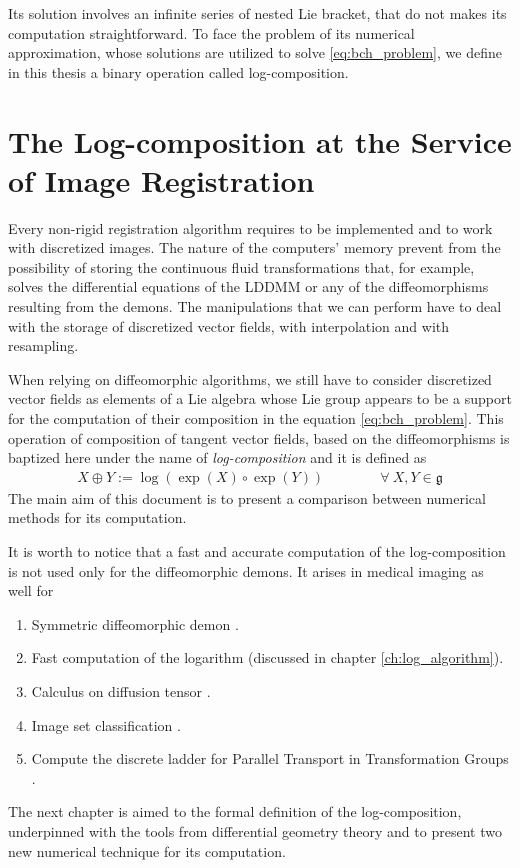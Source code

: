 Its solution involves an infinite series of nested Lie bracket, that do not makes its computation straightforward. 
To face the problem of its numerical approximation, whose solutions are utilized to solve \ref{eq:bch_problem}, we define in this thesis a binary operation called log-composition.


\section{The Log-composition at the Service of Image Registration}

Every non-rigid registration algorithm requires to be implemented and to work with discretized images.
The nature of the computers' memory prevent from the possibility of storing the continuous fluid transformations that, for example, solves the differential equations of the LDDMM or any of the diffeomorphisms resulting from the demons. The manipulations that we can perform have to deal with the storage of discretized vector fields, with interpolation and with resampling.

When relying on diffeomorphic algorithms, we still have to consider discretized vector fields as elements of a Lie algebra whose Lie group appears to be a support for the computation of their composition in the equation \ref{eq:bch_problem}.
This operation of composition of tangent vector fields, based on the diffeomorphisms is baptized here under the name of \emph{log-composition} and it is defined as
\begin{align*}
X \oplus Y := \log(\exp(X)\circ\exp( Y))
\qquad \qquad
\forall ~X, Y \in \mathfrak{g}
\end{align*}
The main aim of this document is to present a comparison between numerical methods for its computation. 

It is worth to notice that a fast and accurate computation of the log-composition is not used only for the diffeomorphic demons. It arises in medical imaging as well for
\begin{enumerate}
	\item Symmetric diffeomorphic demon \cite{vercauteren08}.
	\item Fast computation of the logarithm \cite{Bossa:08} (discussed in chapter \ref{ch:log_algorithm}).
	\item Calculus on diffusion tensor \cite{Arsigny:MRM:06}. 
	\item Image set classification \cite{huanglog}.
	\item Compute the discrete ladder for Parallel Transport in Transformation Groups \cite{Lorenzi:discrete_ladders:14}.
\end{enumerate}	
	
The next chapter is aimed to the formal definition of the log-composition, underpinned with the tools from differential geometry theory and to present two new numerical technique for its computation.


